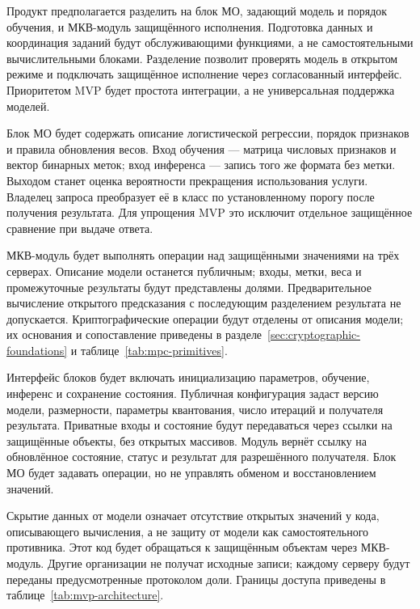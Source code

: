 Продукт предполагается разделить на блок МО, задающий модель и порядок обучения, и МКВ-модуль защищённого исполнения. Подготовка данных и координация заданий будут обслуживающими функциями, а не самостоятельными вычислительными блоками. Разделение позволит проверять модель в открытом режиме и подключать защищённое исполнение через согласованный интерфейс. Приоритетом MVP будет простота интеграции, а не универсальная поддержка моделей.

Блок МО будет содержать описание логистической регрессии, порядок признаков и правила обновления весов. Вход обучения --- матрица числовых признаков и вектор бинарных меток; вход инференса --- запись того же формата без метки. Выходом станет оценка вероятности прекращения использования услуги. Владелец запроса преобразует её в класс по установленному порогу после получения результата. Для упрощения MVP это исключит отдельное защищённое сравнение при выдаче ответа.

МКВ-модуль будет выполнять операции над защищёнными значениями на трёх серверах. Описание модели останется публичным; входы, метки, веса и промежуточные результаты будут представлены долями. Предварительное вычисление открытого предсказания с последующим разделением результата не допускается. Криптографические операции будут отделены от описания модели; их основания и сопоставление приведены в разделе~\ref{sec:cryptographic-foundations} и таблице~\ref{tab:mpc-primitives}.

Интерфейс блоков будет включать инициализацию параметров, обучение, инференс и сохранение состояния. Публичная конфигурация задаст версию модели, размерности, параметры квантования, число итераций и получателя результата. Приватные входы и состояние будут передаваться через ссылки на защищённые объекты, без открытых массивов. Модуль вернёт ссылку на обновлённое состояние, статус и результат для разрешённого получателя. Блок МО будет задавать операции, но не управлять обменом и восстановлением значений.

Скрытие данных от модели означает отсутствие открытых значений у кода, описывающего вычисления, а не защиту от модели как самостоятельного противника. Этот код будет обращаться к защищённым объектам через МКВ-модуль. Другие организации не получат исходные записи; каждому серверу будут переданы предусмотренные протоколом доли. Границы доступа приведены в таблице~\ref{tab:mvp-architecture}.

